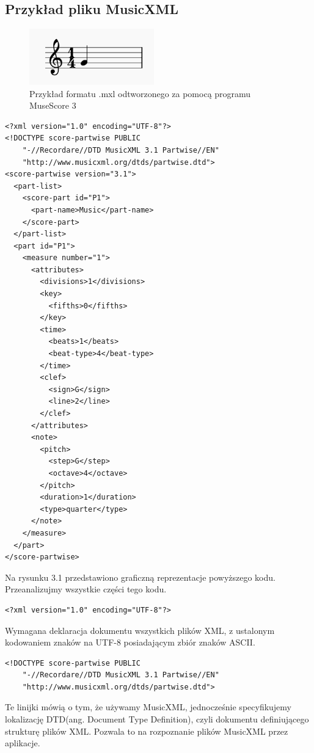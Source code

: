\documentclass[printmode, eng, openany]{mgr}
\newcommand\tab[1][1cm]{\hspace*{#1}}
\begin{document}
\subsection{Przykład pliku MusicXML}
\begin{figure}[!htb]
\centering
\includegraphics[width=5.4cm]{xml_example}
\caption{Przykład formatu .mxl odtworzonego za pomocą programu MuseScore 3}
\end{figure}
\begin{lstlisting}
<?xml version="1.0" encoding="UTF-8"?>
<!DOCTYPE score-partwise PUBLIC
    "-//Recordare//DTD MusicXML 3.1 Partwise//EN"
    "http://www.musicxml.org/dtds/partwise.dtd">
<score-partwise version="3.1">
  <part-list>
    <score-part id="P1">
      <part-name>Music</part-name>
    </score-part>
  </part-list>
  <part id="P1">
    <measure number="1">
      <attributes>
        <divisions>1</divisions>
        <key>
          <fifths>0</fifths>
        </key>
        <time>
          <beats>1</beats>
          <beat-type>4</beat-type>
        </time>
        <clef>
          <sign>G</sign>
          <line>2</line>
        </clef>
      </attributes>
      <note>
        <pitch>
          <step>G</step>
          <octave>4</octave>
        </pitch>
        <duration>1</duration>
        <type>quarter</type>
      </note>
    </measure>
  </part>
</score-partwise>
\end{lstlisting}

\tab Na rysunku 3.1 przedstawiono graficzną reprezentacje powyższego kodu. Przeanalizujmy wszystkie części tego kodu.
 
\begin{lstlisting}
<?xml version="1.0" encoding="UTF-8"?>
\end{lstlisting}
Wymagana deklaracja dokumentu wszystkich plików XML, z ustalonym kodowaniem znaków na UTF-8 posiadającym zbiór znaków ASCII.

\begin{lstlisting}
<!DOCTYPE score-partwise PUBLIC
    "-//Recordare//DTD MusicXML 3.1 Partwise//EN"
    "http://www.musicxml.org/dtds/partwise.dtd">
\end{lstlisting}
Te linijki mówią o tym, że używamy MusicXML, jednocześnie specyfikujemy lokalizację DTD(ang. Document Type Definition), czyli dokumentu definiującego strukturę plików XML. Pozwala to na rozpoznanie plików MusicXML przez aplikacje.
\end{document}
